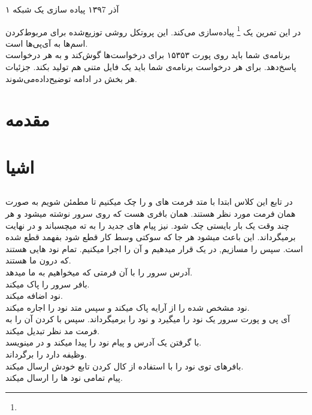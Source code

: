 \documentclass{article}
\begin{document}
    \handout
    {}
    {۱}
    {آذر ۱۳۹7}
    {پیاده سازی یک شبکه     }
    {}
    
    \vspace{0.3cm}
    
    در این تمرین یک 
    \footnote{}
    پیاده‌سازی ‌می‌کند.
    این پروتکل روشی توزیع‌شده برای مربوط‌کردن اسم‌ها به آی‌پی‌ها است.
    \\
    برنامه‌ی شما باید روی پورت ۱۵۳۵۳ برای درخواست‌ها گوش‌کند و به هر درخواست پاسخ‌دهد. برای هر درخواست برنامه‌ی شما باید یک فایل متنی هم تولید بکند. جزئیات هر بخش در ادامه توضیح‌داده‌می‌شوند.
    \\
    \section{مقدمه}
    \section{اشیا}
	\subsection{}
	در تابع      این کلاس ابتدا با متد  فرمت های  و  را چک میکنیم تا مطمئن شویم به صورت همان فرمت مورد نظر هستند.  همان بافری هست که روی سرور نوشته میشود و هر چند وقت یک بار بایستی چک شود.  نیز پیام های جدید را به ته  میچسباند  و در نهایت  برمیگرداند. این  باعث میشود هر جا که سوکتی وسط کار قطع شود بفهمد قطع شده است. سپس  را مسازیم, در یک  قرار میدهیم و آن را اجرا میکنیم.  تمام نود هایی هستند که درون ما هستند.\\
 آدرس سرور را با آن فرمتی که میخواهیم به ما میدهد.
\\ 
 بافر سرور را پاک میکند.
\\
 نود اضافه میکند.
\\
 نود مشخص شده را از آرایه پاک میکند و سپس  متد  نود را اجاره میکند.
\\
 آی پی و پورت سرور  یک نود را میگیرد و نود را برمیگرداند. سپس با  کردن آن را به فرمت مد نظر تبدیل میکند.
\\
 با گرفتن یک آدرس و پیام نود را پیدا میکند و در  مینویسد.
\\
 وظیفه دارد  را برگرداند.
\\
 بافرهای توی نود را با استفاده از کال کردن تابع  خودش ارسال میکند.
\\
 پیام تمامی نود ها را ارسال میکند. 
\\
\end{document}
